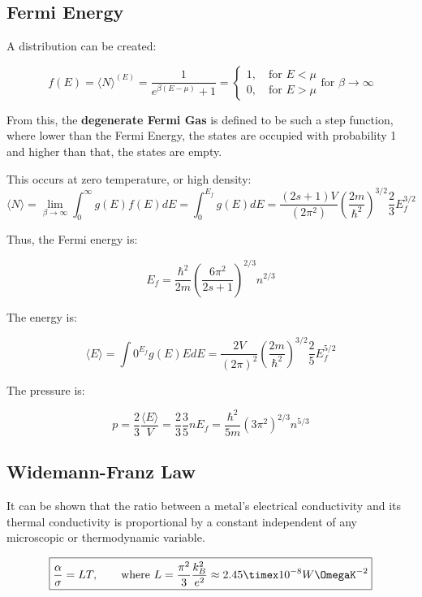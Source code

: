\documentclass[12pt]{article}
\begin{document}
\subsection{Fermi Energy}

A distribution can be created:

\[\boxed{f(E) = \langle N \rangle ^{(E)} = \frac{1}{e^{\beta(E-\mu)} + 1} = \left.
\begin{cases}
1, \quad \text{for } E < \mu\\
0, \quad \text{for } E > \mu
\end{cases}
\right.
\text{for } \beta \to \infty
}\]

From this, the \textbf{degenerate Fermi Gas} is defined to be such a step function, where lower than the Fermi Energy, the states are occupied with probability 1 and higher than that, the states are empty. 

This occurs at zero temperature, or high density:
\[
\boxed{
\langle N \rangle = \lim_{\beta\to \infty}\int^\infty_0 g(E)f(E)dE = \int^{E_f}_0g(E)dE = \frac{(2s+1)V}{(2\pi^2)}\left(\frac{2m}{\hbar^2}\right)^{3/2}\frac23E_f^{3/2}
}\]

Thus, the Fermi energy is:

\[\boxed{E_f = \frac{\hbar^2}{2m}\left(\frac{6\pi^2}{2s+1}\right)^{2/3}n^{2/3}}\]

The energy is:

\[\boxed{
\langle E \rangle = \int0^{E_f}g(E)EdE = \frac{2V}{(2\pi)^2}\left(\frac{2m}{\hbar^2}\right)^{3/2}\frac25E_f^{5/2}
}\]

The pressure is:

\[
\boxed{
p = \frac23 \frac{\langle E \rangle}{V} = \frac23 \frac35nE_f = \frac{\hbar^2}{5m}(3\pi^2)^{2/3}n^{5/3}
}
\]

\subsection{Widemann-Franz Law}

It can be shown that the ratio between a metal's electrical conductivity and its thermal conductivity is proportional by a constant independent of any microscopic or thermodynamic variable.

\[\boxed{\frac{\alpha}{\sigma}= LT, \qquad \text{where } L = \frac{\pi^2}{3}\frac{k_B^2}{e^2}\approx2.45\timex10^{-8}W\OmegaK^{-2}}\]
\end{document}
